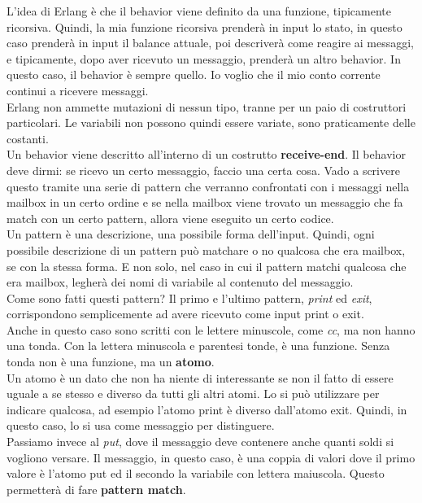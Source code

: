 \documentclass{article}
\begin{document}
L'idea di Erlang è che il behavior viene definito da una funzione, tipicamente ricorsiva. Quindi, la mia funzione ricorsiva prenderà in input lo stato, in questo caso prenderà in input il balance attuale, poi descriverà come reagire ai messaggi, e tipicamente, dopo aver ricevuto un messaggio, prenderà un altro behavior. In questo caso, il behavior è sempre quello. Io voglio che il mio conto corrente continui a ricevere messaggi.\vspace{14pt}\\
Erlang non ammette mutazioni di nessun tipo, tranne per un paio di costruttori particolari. Le variabili non possono quindi essere variate, sono praticamente delle costanti.\vspace{14pt}\\
Un behavior viene descritto all'interno di un costrutto \textbf{receive-end}.
Il behavior deve dirmi: se ricevo un certo messaggio, faccio una certa cosa. Vado a scrivere questo tramite una serie di pattern che verranno confrontati con i messaggi nella mailbox in un certo ordine e se nella mailbox viene trovato un messaggio che fa match con un certo pattern, allora viene eseguito un certo codice.\\
Un pattern è una descrizione, una possibile forma dell'input. Quindi, ogni possibile descrizione di un pattern può matchare o no qualcosa che era mailbox, se con la stessa forma. E non solo, nel caso in cui il pattern matchi qualcosa che era mailbox, legherà dei nomi di variabile al contenuto del messaggio.\vspace{14pt}\\
Come sono fatti questi pattern? Il primo e l'ultimo pattern, \textit{print} ed \textit{exit}, corrispondono semplicemente ad avere ricevuto come input print o exit.\\
Anche in questo caso sono scritti con le lettere minuscole, come \textit{cc}, ma non hanno una tonda.
Con la lettera minuscola e parentesi tonde, è una funzione. Senza tonda non è una funzione, ma un \textbf{atomo}.\\
Un atomo è un dato che non ha niente di interessante se non il fatto di essere uguale a se stesso e diverso da tutti gli altri atomi. Lo si può utilizzare per indicare qualcosa, ad esempio l'atomo print è diverso dall'atomo exit. Quindi, in questo caso, lo si usa come messaggio per distinguere.\vspace{14pt}\\
Passiamo invece al \textit{put}, dove il messaggio deve contenere anche quanti soldi si vogliono versare. Il messaggio, in questo caso, è una coppia di valori dove il primo valore è l'atomo put ed il secondo la variabile con lettera maiuscola. Questo permetterà di fare \textbf{pattern match}.\\
\end{document}
